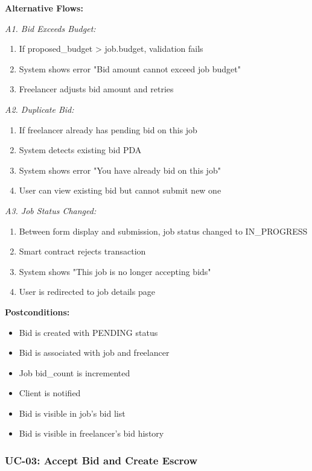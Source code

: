 \documentclass[a4paper,13pt,twoside]{report}
\theoremstyle{definition}
\begin{document}
\textbf{Alternative Flows:}

\textit{A1. Bid Exceeds Budget:}
\begin{enumerate}
    \item If proposed\_budget > job.budget, validation fails
    \item System shows error "Bid amount cannot exceed job budget"
    \item Freelancer adjusts bid amount and retries
\end{enumerate}

\textit{A2. Duplicate Bid:}
\begin{enumerate}
    \item If freelancer already has pending bid on this job
    \item System detects existing bid PDA
    \item System shows error "You have already bid on this job"
    \item User can view existing bid but cannot submit new one
\end{enumerate}

\textit{A3. Job Status Changed:}
\begin{enumerate}
    \item Between form display and submission, job status changed to IN\_PROGRESS
    \item Smart contract rejects transaction
    \item System shows "This job is no longer accepting bids"
    \item User is redirected to job details page
\end{enumerate}

\textbf{Postconditions:}
\begin{itemize}
    \item Bid is created with PENDING status
    \item Bid is associated with job and freelancer
    \item Job bid\_count is incremented
    \item Client is notified
    \item Bid is visible in job's bid list
    \item Bid is visible in freelancer's bid history
\end{itemize}

\subsubsection{UC-03: Accept Bid and Create Escrow}
\end{document}
